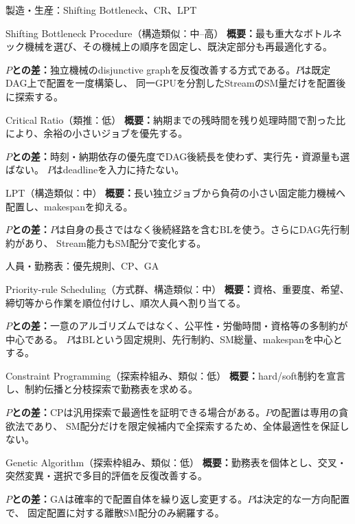 \documentclass[aspectratio=169,10pt]{beamer}
\begin{document}
\begin{frame}{製造・生産：Shifting Bottleneck、CR、LPT}
  \scriptsize
  \begin{block}{Shifting Bottleneck Procedure（構造類似：中--高）}
    \textbf{概要：}最も重大なボトルネック機械を選び、その機械上の順序を固定し、既決定部分も再最適化する。\par
    \textbf{$P$との差：}独立機械のdisjunctive graphを反復改善する方式である。$P$は既定DAG上で配置を一度構築し、
    同一GPUを分割したStreamのSM量だけを配置後に探索する。
  \end{block}
  \begin{block}{Critical Ratio（類推：低）}
    \textbf{概要：}納期までの残時間を残り処理時間で割った比により、余裕の小さいジョブを優先する。\par
    \textbf{$P$との差：}時刻・納期依存の優先度でDAG後続長を使わず、実行先・資源量も選ばない。
    $P$はdeadlineを入力に持たない。
  \end{block}
  \begin{block}{LPT（構造類似：中）}
    \textbf{概要：}長い独立ジョブから負荷の小さい固定能力機械へ配置し、makespanを抑える。\par
    \textbf{$P$との差：}$P$は自身の長さではなく後続経路を含むBLを使う。さらにDAG先行制約があり、
    Stream能力もSM配分で変化する。
  \end{block}
\end{frame}

\begin{frame}{人員・勤務表：優先規則、CP、GA}
  \scriptsize
  \begin{block}{Priority-rule Scheduling（方式群、構造類似：中）}
    \textbf{概要：}資格、重要度、希望、締切等から作業を順位付けし、順次人員へ割り当てる。\par
    \textbf{$P$との差：}一意のアルゴリズムではなく、公平性・労働時間・資格等の多制約が中心である。
    $P$はBLという固定規則、先行制約、SM総量、makespanを中心とする。
  \end{block}
  \begin{block}{Constraint Programming（探索枠組み、類似：低）}
    \textbf{概要：}hard/soft制約を宣言し、制約伝播と分枝探索で勤務表を求める。\par
    \textbf{$P$との差：}CPは汎用探索で最適性を証明できる場合がある。$P$の配置は専用の貪欲法であり、
    SM配分だけを限定候補内で全探索するため、全体最適性を保証しない。
  \end{block}
  \begin{block}{Genetic Algorithm（探索枠組み、類似：低）}
    \textbf{概要：}勤務表を個体とし、交叉・突然変異・選択で多目的評価を反復改善する。\par
    \textbf{$P$との差：}GAは確率的で配置自体を繰り返し変更する。$P$は決定的な一方向配置で、
    固定配置に対する離散SM配分のみ網羅する。
  \end{block}
\end{frame}
\end{document}
